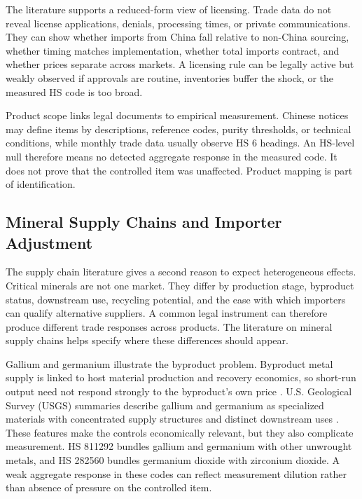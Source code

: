 \documentclass[12pt,a4paper]{article}
\numberwithin{equation}{section}
\begin{document}
The literature supports a reduced-form view of licensing. Trade data do not reveal license applications, denials, processing times, or private communications. They can show whether imports from China fall relative to non-China sourcing, whether timing matches implementation, whether total imports contract, and whether prices separate across markets. A licensing rule can be legally active but weakly observed if approvals are routine, inventories buffer the shock, or the measured HS code is too broad.

Product scope links legal documents to empirical measurement. Chinese notices may define items by descriptions, reference codes, purity thresholds, or technical conditions, while monthly trade data usually observe HS 6 headings. An HS-level null therefore means no detected aggregate response in the measured code. It does not prove that the controlled item was unaffected. Product mapping is part of identification.

\subsection{Mineral Supply Chains and Importer Adjustment}

The supply chain literature gives a second reason to expect heterogeneous effects. Critical minerals are not one market. They differ by production stage, byproduct status, downstream use, recycling potential, and the ease with which importers can qualify alternative suppliers. A common legal instrument can therefore produce different trade responses across products. The literature on mineral supply chains helps specify where these differences should appear.

Gallium and germanium illustrate the byproduct problem. Byproduct metal supply is linked to host material production and recovery economics, so short-run output need not respond strongly to the byproduct's own price \citep{frenzel2017byproduct_metals}. U.S. Geological Survey (USGS) summaries describe gallium and germanium as specialized materials with concentrated supply structures and distinct downstream uses \citep{usgs_mcs_2025}. These features make the controls economically relevant, but they also complicate measurement. HS 811292 bundles gallium and germanium with other unwrought metals, and HS 282560 bundles germanium dioxide with zirconium dioxide. A weak aggregate response in these codes can reflect measurement dilution rather than absence of pressure on the controlled item.
\end{document}
